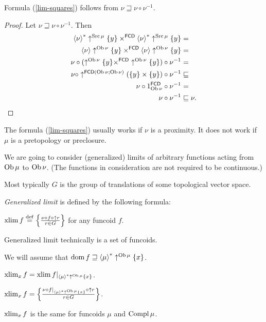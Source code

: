 \begin{prop}
Formula (\ref{lim-squares}) follows from $\nu\sqsupseteq\nu\circ\nu^{-1}$.\end{prop}
\begin{proof}
Let $\nu\sqsupseteq\nu\circ\nu^{-1}$. Then
\begin{align*}
\left\langle \nu\right\rangle ^{\ast}\uparrow^{\operatorname{Src}\mu}\{y\}\times^{\mathsf{FCD}}\left\langle \nu\right\rangle ^{\ast}\uparrow^{\operatorname{Src}\mu}\{y\} & =\\
\left\langle \nu\right\rangle\uparrow^{\operatorname{Ob}\nu}\{y\}\times^{\mathsf{FCD}}\left\langle \nu\right\rangle\uparrow^{\operatorname{Ob}\nu}\{y\} & =\\
\nu\circ(\uparrow^{\operatorname{Ob}\nu}\{y\}\times^{\mathsf{FCD}}\uparrow^{\operatorname{Ob}\nu}\{y\})\circ\nu^{-1} & =\\
\nu\circ\uparrow^{\mathsf{FCD}(\operatorname{Ob}\nu;\operatorname{Ob}\nu)}(\{y\}\times\{y\})\circ\nu^{-1} & \sqsubseteq\\
\nu\circ1_{\operatorname{Ob}\nu}^{\mathsf{FCD}}\circ\nu^{-1} & =\\
\nu\circ\nu^{-1} & \sqsubseteq\nu.
\end{align*}
\end{proof}
\begin{rem}
The formula (\ref{lim-squares}) usually works if $\nu$ is a proximity.
It does not work if $\mu$ is a pretopology or preclosure.
\end{rem}
We are going to consider (generalized) limits of arbitrary functions
acting from $\operatorname{Ob}\mu$ to $\operatorname{Ob}\nu$. (The functions in consideration
are not required to be continuous.)
\begin{rem}
Most typically $G$ is the group of translations of some topological
vector space.
\end{rem}
\emph{Generalized limit} is defined by the following formula:
\begin{defn}
$\operatorname{xlim} f\overset{\mathrm{def}}{=}\left\{ \frac{\nu\circ f\circ\uparrow r}{r\in G}\right\}$
for any funcoid $f$.\end{defn}
\begin{rem}
Generalized limit technically is a set of funcoids.
\end{rem}
We will assume that $\operatorname{dom} f\sqsupseteq\left\langle \mu\right\rangle ^{\ast}\uparrow^{\operatorname{Ob}\mu}\{x\}$.
\begin{defn}
$\operatorname{xlim}_{x}f=\operatorname{xlim} f|_{\left\langle \mu\right\rangle ^{\ast}\uparrow^{\operatorname{Ob}\mu}\{x\}}$.\end{defn}
\begin{obvious}
$\operatorname{xlim}_{x}f=\left\{ \frac{\nu\circ f|_{\left\langle \mu\right\rangle ^{\ast}\uparrow^{\operatorname{Ob}\mu}\{x\}}\circ\uparrow r}{r\in G}\right\}$.\end{obvious}
\begin{rem}
$\operatorname{xlim}_{x}f$ is the same for funcoids $\mu$ and $\operatorname{Compl}\mu$.
\end{rem}
